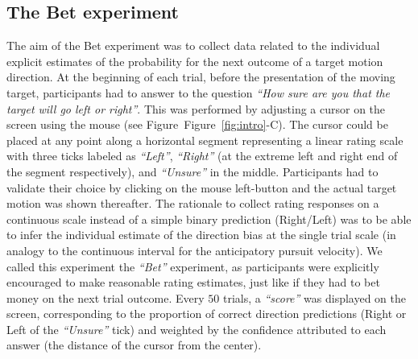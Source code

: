 \documentclass[10pt,letterpaper]{article}
\newcommand{\seeFig}[1]{Figure~\ref{fig:#1}}
\begin{document}
\subsection*{The Bet experiment}
The aim of the Bet experiment was to collect data related to the individual explicit estimates of the probability for the next outcome of a target motion direction. At the beginning of each trial, before the presentation of the moving target, participants had to answer to the question \textit{ ``How sure are you that the target will go left or right''}. This was performed by adjusting a cursor on the screen using the mouse (see Figure~\seeFig{intro}-C). The cursor could be placed at any point along a horizontal segment representing a linear rating scale with three ticks labeled as \textit{ ``Left''}, \textit{``Right''} (at the extreme left and right end of the segment respectively), and \textit{``Unsure''} in the middle. Participants had to validate their choice by clicking on the mouse left-button and the actual target motion was shown thereafter. The rationale to collect rating responses on a continuous scale instead of a simple binary prediction (Right/Left) was to be able to infer the individual estimate of the direction bias at the single trial scale (in analogy to the continuous interval for the anticipatory pursuit velocity). We called this experiment the \textit{ ``Bet''} experiment, as participants were explicitly encouraged to make reasonable rating estimates, just like if they had to bet money on the next trial outcome. Every $50$ trials, a \textit{``score''} was displayed on the screen, corresponding to the proportion of correct direction predictions (Right or Left of the \textit{``Unsure''} tick) and weighted by the confidence attributed to each answer (the distance of the cursor from the center).
\end{document}
